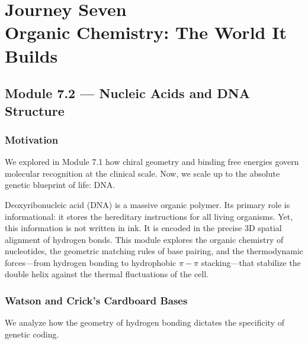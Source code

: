 \documentclass[12pt, a4paper]{book}
\begin{document}
\setcounter{chapter}{6}
\chapter[Journey 7 --- Organic Chemistry: The World It Builds]
        {Journey Seven\\[8pt]
         \textcolor{ModuleColor}{\large Organic Chemistry: The World It Builds}}
\setcounter{section}{1}

\section{Module 7.2 --- Nucleic Acids and DNA Structure}
\label{sec:mod7.2}

\subsection*{Motivation}

We explored in Module 7.1 how chiral geometry and binding free energies govern molecular recognition at the clinical scale.
Now, we scale up to the absolute genetic blueprint of life: DNA.

Deoxyribonucleic acid (DNA) is a massive organic polymer.
Its primary role is informational: it stores the hereditary instructions for all living organisms.
Yet, this information is not written in ink. It is encoded in the precise 3D spatial alignment of hydrogen bonds.
This module explores the organic chemistry of nucleotides, the geometric matching rules of base pairing, and the thermodynamic forces—from hydrogen bonding to hydrophobic $\pi-\pi$ stacking—that stabilize the double helix against the thermal fluctuations of the cell.

\subsection{Watson and Crick's Cardboard Bases}

We analyze how the geometry of hydrogen bonding dictates the specificity of genetic coding.
\end{document}
